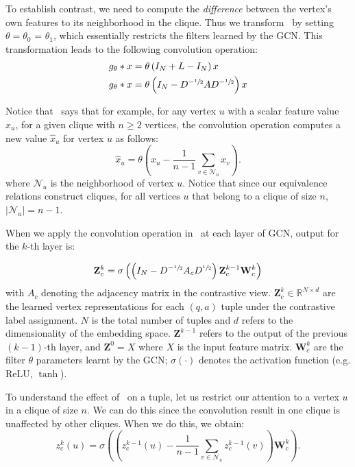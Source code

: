 To establish contrast, we need to compute the \emph{difference} between the vertex's own features to its neighborhood in the clique. Thus we transform~ by setting $\theta = \theta_{0}$ = $\theta_{1}$, which essentially restricts the filters learned by the GCN. This transformation leads to the following convolution operation:
\begin{align}
g_{\theta} * x & =  \theta \left( I_N + L- I_{N} \right) x \\
g_{\theta} * x & =  \theta \left( I_N - D^{-\sfrac{1}{2}} A D^{-\sfrac{1}{2}}\right) x \label{eq:contrastdetail}
\end{align}

Notice that~ says that for example, for any vertex $u$ with a scalar feature value $x_u$, for a given clique with $n \geq 2$ vertices, the convolution operation computes a new value $\hat{x}_u$ for vertex $u$ as follows:
\begin{equation}
  \hat{x}_u = \theta \left ( x_u - \frac{1}{n-1} \sum_{v \in \mathcal{N}_u} x_v \right ).
\end{equation}
where $\mathcal{N}_u$ is the neighborhood of vertex $u$. Notice that since our equivalence relations construct cliques, for all vertices $u$ that belong to a clique of size $n$, $|\mathcal{N}_u| = n-1$.

When we apply the convolution operation in~ at each layer of GCN, output for the $k$-th layer is:

\begin{equation}
  \label{eq:contrast}
  \mathbf{Z}_c^{k} = \sigma \left( \left (I_N - D^{-\sfrac{1}{2}}A_cD^{\sfrac{1}{2}} \right) \mathbf{Z}_c^{k-1} \mathbf{W}_c^{k}\right)
\end{equation}
with $A_c$ denoting the adjacency matrix in the contrastive view. $\mathbf{Z}_c^{k} \in \mathbb{R}^{N \times d}$ are the learned vertex representations for each $(q,a)$ tuple under the contrastive label assignment. $N$ is the total number of tuples and $d$ refers to the dimensionality of the embedding space. $\mathbf{Z}^{k-1}$ refers to the output of the previous $(k-1)$-{th} layer, and $\mathbf{Z}^{0} = X$ where $X$ is the input feature matrix. $\mathbf{W}_c^{k}$ are the filter $\theta$ parameters learnt by the GCN; $\sigma( \cdot)$ denotes the activation function (e.g. ReLU, $\tanh$).

To understand the effect of~ on a tuple, let us restrict our attention to a vertex $u$ in a clique of size $n$. We can do this since the convolution result in one clique is unaffected by other cliques. When we do this, we obtain:
\begin{equation}
  z_c^{k}(u) = \sigma \left(\left(z_c^{k-1}(u) - \frac{1}{n-1} \sum_{v \in \mathcal{N}_u} z_c^{k-1}(v) \right) \mathbf{W}_{c}^{k}\right). \label{eq:contrastrestrict}
  \end{equation}

